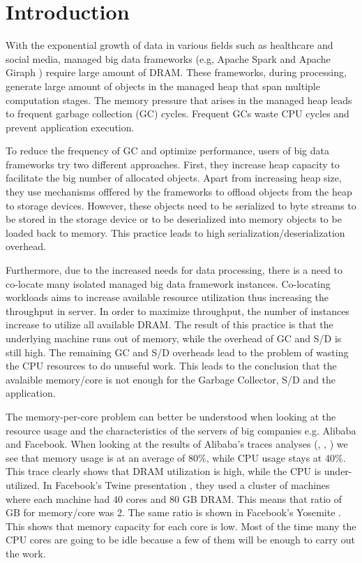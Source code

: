 \section{Introduction}
\label{sec:intro}

With the exponential growth of data in various fields such as
healthcare and social media, managed big data frameworks (e.g, Apache
Spark \cite{Spark} and Apache Giraph \cite{Giraph}) require large
amount of DRAM. These frameworks, during processing, generate large
amount of objects in the managed heap that span multiple computation
stages. The memory pressure that arises in the managed heap leads to
frequent garbage collection (GC) cycles. Frequent GCs waste CPU cycles 
and prevent application execution.

To reduce the frequency of GC and optimize performance, users of big data
frameworks try two different approaches. First, they increase heap capacity to
facilitate the big number of allocated objects. Apart from increasing
heap size, they use mechanisms offfered by the frameworks 
to offload objects from the heap to storage devices. However, these
objects need to be serialized to byte streams to be stored in the storage
device or to be deserialized into memory objects to be loaded back to memory. 
This practice leads to high serialization/deserialization overhead.

Furthermore, due to the increased needs for data processing, there is
a need to co-locate many isolated managed big data framework
instances. Co-locating workloads aims to increase available resource utilization
thus increasing the throughput in server. 
In order to maximize throughput, the number of instances
increase to utilize all available DRAM. The result of this
practice is that the underlying machine runs out of memory, while the
 overhead of GC and S/D is still high. The remaining GC and S/D
overheads lead to the problem of wasting the CPU resources
to do unuseful work. This leads to the conclusion that the avalaible memory/core is
not enough for the Garbage Collector, S/D and the application.

The memory-per-core problem can better be understood when looking at
the resource usage and the characteristics of the servers of big
companies e.g. Alibaba and Facebook. When looking at the results of
Alibaba's traces analyses (\cite{Alibaba}, \cite{Alibaba1},
\cite{Alibabacolocated}) we see that memory usage is at an average of
80\%, while CPU usage stays at 40\%. This trace clearly shows that
DRAM utilization is high, while the CPU is under-utilized. In
Facebook's Twine presentation \cite{Twine}, they used a cluster of
machines where each machine had 40 cores and 80 GB DRAM. This means
that ratio of GB for memory/core was 2. The same ratio is shown in Facebook's Yosemite
\cite{Yosemite}. This shows that memory
capacity for each core is low. Most of the time many the CPU cores are
going to be idle because a few of them will be enough to carry out the
work.

